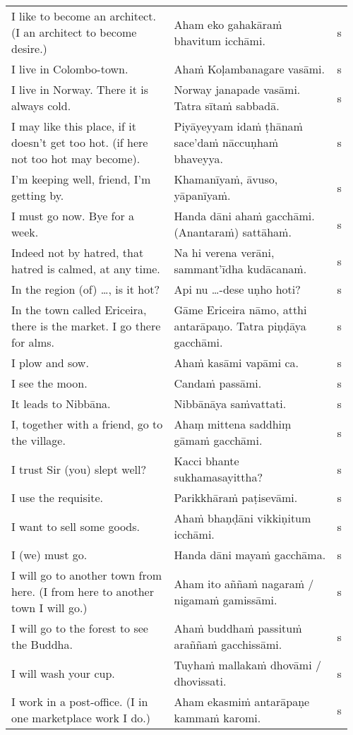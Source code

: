 \documentclass[a5paper]{memoir}
\begin{document}
\begin{longtable}{L{0.48\linewidth} L{0.48\linewidth} H}
I like to become an architect. (I an architect to become desire.) & Aham eko gahakāraṁ bhavitum icchāmi. & s\\[0pt]
I live in Colombo-town. & Ahaṁ Koḷambanagare vasāmi. & s\\[0pt]
I live in Norway. There it is always cold. & Norway janapade vasāmi. Tatra sītaṁ sabbadā. & s\\[0pt]
I may like this place, if it doesn't get too hot. (if here not too hot may become). & Piyāyeyyam idaṁ ṭhānaṁ sace'daṁ nāccuṇhaṁ bhaveyya. & s\\[0pt]
I'm keeping well, friend, I'm getting by. & Khamanīyaṁ, āvuso, yāpanīyaṁ. & s\\[0pt]
I must go now. Bye for a week. & Handa dāni ahaṁ gacchāmi. (Anantaraṁ) sattāhaṁ. & s\\[0pt]
Indeed not by hatred, that hatred is calmed, at any time. & Na hi verena verāni, sammant'īdha kudācanaṁ. & s\\[0pt]
In the region (of) \ldots{}, is it hot? & Api nu \ldots{}-dese uṇho hoti? & s\\[0pt]
In the town called Ericeira, there is the market. I go there for alms. & Gāme Ericeira nāmo, atthi antarāpaṇo. Tatra piṇḍāya gacchāmi. & s\\[0pt]
I plow and sow. & Ahaṁ kasāmi vapāmi ca. & s\\[0pt]
I see the moon. & Candaṁ passāmi. & s\\[0pt]
It leads to Nibbāna. & Nibbānāya saṁvattati. & s\\[0pt]
I, together with a friend, go to the village. & Ahaṃ mittena saddhiṃ gāmaṁ gacchāmi. & s\\[0pt]
I trust Sir (you) slept well? & Kacci bhante sukhamasayittha? & s\\[0pt]
I use the requisite. & Parikkhāraṁ paṭisevāmi. & s\\[0pt]
I want to sell some goods. & Ahaṁ bhaṇḍāni vikkiṇitum icchāmi. & s\\[0pt]
I (we) must go. & Handa dāni mayaṁ gacchāma. & s\\[0pt]
I will go to another town from here. (I from here to another town I will go.) & Aham ito aññaṁ nagaraṁ / nigamaṁ gamissāmi. & s\\[0pt]
I will go to the forest to see the Buddha. & Ahaṁ buddhaṁ passituṁ araññaṁ gacchissāmi. & s\\[0pt]
I will wash your cup. & Tuyhaṁ mallakaṁ dhovāmi / dhovissati. & s\\[0pt]
I work in a post-office. (I in one marketplace work I do.) & Aham ekasmiṁ antarāpaṇe kammaṁ karomi. & s\\[0pt]

\end{longtable}
\end{document}

